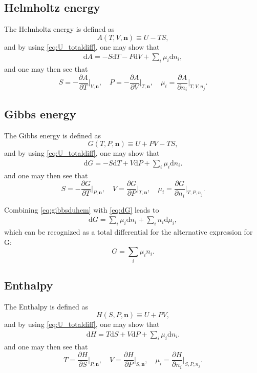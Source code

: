 \documentclass[english]{../thermomemo/thermomemo}
\newcommand{\pone}[3]{\frac{\partial #1}{\partial #2}\bigg|_{#3}}%
\newcommand*{\vektor}[1]{\boldsymbol{#1}}%
\newcommand{\dd}[1]{\mathrm{d}{#1}}
\begin{document}
\subsection{Helmholtz energy}
The Helmholtz energy is defined as
\begin{equation}
  A(T,V,\vektor{n}) \equiv U - TS,
  \label{eq:helmholtz_def}
\end{equation}
and by using \eqref{eq:U_totaldiff}, one may show that
\begin{align}
  \dd{A} = -S\dd{T} - P\dd{V} + \sum_i \mu_i \dd{n_i},
  \label{}
\end{align}
and one may then see that
\begin{equation}
  S = -\pone{A}{T}{V,\vektor{n}}, \quad P = -\pone{A}{V}{T,\vektor{n}}, \quad \mu_i = \pone{A}{n_i}{T,V,n_j}.
  \label{eq:A_differentials}
\end{equation}


\subsection{Gibbs energy}
The Gibbs energy is defined as 
\begin{equation}
  G(T,P,\vektor{n}) \equiv U + PV - TS,
  \label{eq:gibbs_def}
\end{equation}
and by using \eqref{eq:U_totaldiff}, one may show that
\begin{align}
  \dd{G} = -S\dd{T} + V\dd{P} + \sum_i \mu_i \dd{n_i}.
  \label{eq:dG}
\end{align}
and one may then see that
\begin{equation}
  S = -\pone{G}{T}{P,\vektor{n}}, \quad V = \pone{G}{P}{T,\vektor{n}}, \quad \mu_i = \pone{G}{n_i}{T,P,n_j}.
  \label{}
\end{equation}

Combining \eqref{eq:gibbsduhem} with \eqref{eq:dG} leads to  
\begin{align}
  \dd{G} = \sum_i \mu_i \dd{n_i} + \sum_i n_i \dd{\mu_i},
  \label{}
\end{align}
which can be recognized as a total differential for the alternative expression for G:
\begin{equation}
  G = \sum_i \mu_i n_i.
  \label{eq:G_alt}
\end{equation}


\subsection{Enthalpy}
The Enthalpy is defined as 
\begin{equation}
  H(S,P,\vektor{n}) \equiv U + PV,
  \label{}
\end{equation}
and by using \eqref{eq:U_totaldiff}, one may show that
\begin{align}
  \dd{H} = T\dd{S} + V\dd{P} + \sum_i \mu_i \dd{n_i}.
  \label{eq:dH}
\end{align}
and one may then see that
\begin{equation}
  T = \pone{H}{S}{P,\vektor{n}}, \quad V = \pone{H}{P}{S,\vektor{n}}, \quad \mu_i = \pone{H}{n_i}{S,P,n_j}.
  \label{}
\end{equation}
\end{document}
